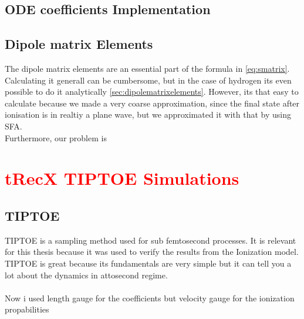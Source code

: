 \subsection{ODE coefficients Implementation}




\subsection{Dipole matrix Elements}
The dipole matrix elements are an essential part of the formula in \eqref{eq:smatrix}. 
Calculating it generall can be cumbersome, but in the case of hydrogen its even possible to do it analytically \ref{sec:dipolematrixelements}.
However, its that easy to calculate because we made a very coarse approximation, since the final state after ionisation is in realtiy a plane wave, but we approximated it with that by using SFA.\\
Furthermore, our problem is 






\section{\textcolor{red}{tRecX TIPTOE Simulations}}
\subsection{TIPTOE}
TIPTOE \cite{Park:18} is a sampling method used for sub femtosecond processes. It is relevant for this thesis because it was used to verify the results from the Ionization model. 
TIPTOE is great because its fundamentals are very simple but it can tell you a lot about the dynamics in attosecond regime. \\\\

Now i used length gauge for the coefficients but velocity gauge for the ionization propabilities






